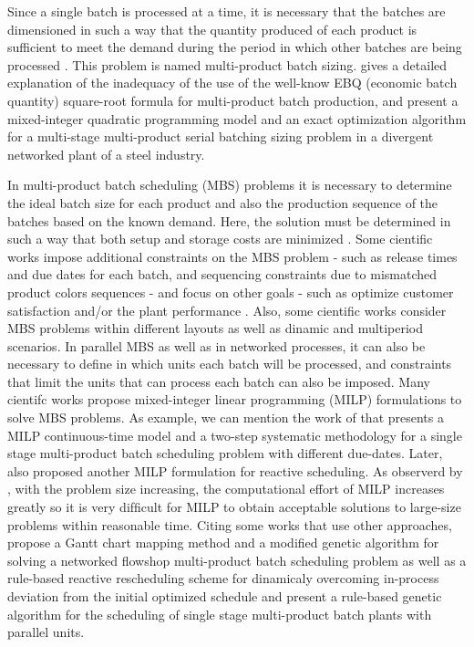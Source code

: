 \documentclass[10pt,fleqn,a4paper,twoside]{article}
\begin{document}
Since a single batch is processed at a time, it is necessary that the batches are dimensioned in such a way that the quantity produced of each product is sufficient to meet the demand during the period in which other batches are being processed \citep{Eilon1985}. This problem is named multi-product batch sizing. \cite{Eilon1985} gives a detailed explanation of the inadequacy of the use of the well-know EBQ (economic batch quantity) square-root formula for multi-product batch production, and \cite{LiuEtAl2020} present a mixed-integer quadratic programming model and an exact optimization algorithm for a multi-stage multi-product serial batching sizing problem in a divergent networked plant of a steel industry.

In multi-product batch scheduling (MBS) problems it is necessary to determine the ideal batch size for each product and also the production sequence of the batches based on the known demand. Here, the solution must be determined in such a way that both setup and storage costs are minimized \citep{Eilon1985, Omega1993, LiuEtAl2020}. Some cientific works impose additional constraints on the MBS problem - such as release times and due dates for each batch, and sequencing constraints due to mismatched product colors sequences - and focus on other goals - such as optimize customer satisfaction and/or the plant performance \citep{MendezEtAll2000, ShiEtAll2017}. Also, some cientific works consider MBS problems within different layouts as well as dinamic and multiperiod scenarios. In parallel MBS as well as in networked processes, it can also be necessary to define in which units each batch will be processed, and constraints that limit the units that can process each batch can also be imposed. Many cientifc works propose mixed-integer linear programming (MILP) formulations to solve MBS problems. As example, we can mention the work of \cite{MendezEtAll2000} that presents a MILP continuous-time model and a two-step systematic methodology for a single stage multi-product batch scheduling problem with different due-dates. Later, \cite{MendezCerda2003} also proposed another MILP formulation for reactive scheduling. As observerd by \cite{HeHui2008}, with the problem size increasing, the computational effort of MILP increases greatly so it is very difﬁcult for MILP to obtain acceptable solutions to large-size problems within reasonable time. Citing some works that use other approaches, \cite {KimEtAl1996} propose a Gantt chart mapping method and a modified genetic algorithm for solving a networked flowshop multi-product batch scheduling problem as well as a rule-based reactive rescheduling scheme for dinamicaly overcoming in-process deviation from the initial optimized schedule and \cite{HeHui2008} present a rule-based genetic algorithm for the scheduling of single stage multi-product batch plants with parallel units.
\end{document}
